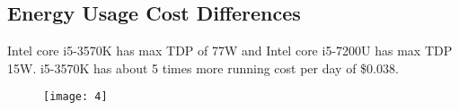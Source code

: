 \documentclass[]{article}
\begin{document}
	\subsection{Energy Usage Cost Differences}
	Intel core i5-3570K has max TDP of 77W and Intel core i5-7200U has max TDP 15W. i5-3570K has about 5 times more running cost per day of \$0.038. \begin{figure}
		\centering
		\texttt{[image: 4]}
		\caption{}
		\label{fig:4}
	\end{figure}
	
\end{document}

